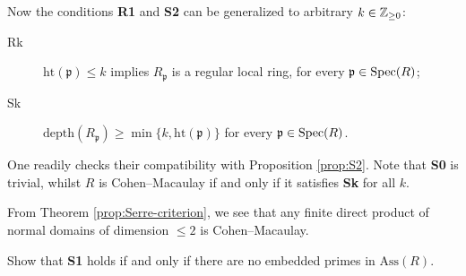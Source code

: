 Now the conditions \textbf{R1} and \textbf{S2} can be generalized to arbitrary $k \in \mathbb{Z}_{\geq 0}$:
\begin{description}
	\item[Rk] $\text{ht}(\mathfrak{p}) \leq k$ implies $R_{\mathfrak{p}}$ is a regular local ring, for every $\mathfrak{p} \in \operatorname{Spec}(R)$;
	\item[Sk] $\text{depth}(R_{\mathfrak{p}}) \geq \min\{ k, \text{ht}(\mathfrak{p})\}$ for every $\mathfrak{p} \in \operatorname{Spec}(R)$.
\end{description}
One readily checks their compatibility with Proposition \ref{prop:S2}. Note that \textbf{S0} is trivial, whilst $R$ is Cohen--Macaulay if and only if it satisfies \textbf{Sk} for all $k$.

\begin{example}
	From Theorem \ref{prop:Serre-criterion}, we see that any finite direct product of normal domains of dimension $\leq 2$ is Cohen--Macaulay.
\end{example}

\begin{exercise}
	Show that \textbf{S1} holds if and only if there are no embedded primes in $\text{Ass}(R)$.
\end{exercise}